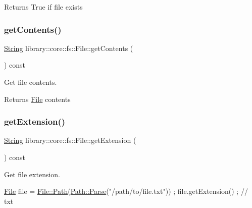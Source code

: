 \begin{DoxyReturn}{Returns}
True if file exists 
\end{DoxyReturn}
\mbox{\label{classlibrary_1_1core_1_1fs_1_1_file_a0a48a4d886d255e53e35511f1519e7fa}} 
\subsubsection{\texorpdfstring{get\+Contents()}{getContents()}}
{\footnotesize\ttfamily \hyperlink{classlibrary_1_1core_1_1types_1_1_string}{String} library\+::core\+::fs\+::\+File\+::get\+Contents (\begin{DoxyParamCaption}{ }\end{DoxyParamCaption}) const}



Get file contents. 

\begin{DoxyReturn}{Returns}
\hyperlink{classlibrary_1_1core_1_1fs_1_1_file}{File} contents 
\end{DoxyReturn}
\mbox{\label{classlibrary_1_1core_1_1fs_1_1_file_acfb85ab6934afc65ecf53a1a08775f84}} 
\subsubsection{\texorpdfstring{get\+Extension()}{getExtension()}}
{\footnotesize\ttfamily \hyperlink{classlibrary_1_1core_1_1types_1_1_string}{String} library\+::core\+::fs\+::\+File\+::get\+Extension (\begin{DoxyParamCaption}{ }\end{DoxyParamCaption}) const}



Get file extension. 


\begin{DoxyCode}
\hyperlink{classlibrary_1_1core_1_1fs_1_1_file_a6f3f0d79545ac9984c6f49432f0c6c39}{File} file = \hyperlink{classlibrary_1_1core_1_1fs_1_1_file_a72d6cdf8bb7e299889c6149e2b8a6cc7}{File::Path}(\hyperlink{classlibrary_1_1core_1_1fs_1_1_path_a6ba644b6609507e724c217bf2020f5ae}{Path::Parse}(\textcolor{stringliteral}{"/path/to/file.txt"})) ;
file.getExtension() ; \textcolor{comment}{// txt}
\end{DoxyCode}


